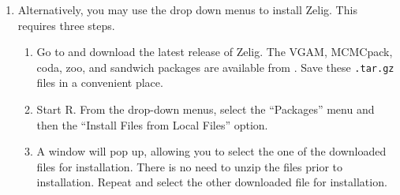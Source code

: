 \begin{enumerate}
\begin{enumerate}
  \item Alternatively, you may use the drop down menus to install
    Zelig.  This requires three steps.  
  \begin{enumerate} 
  \item Go to  and 
    download the latest release of Zelig.  The VGAM, MCMCpack,
coda, zoo, and sandwich packages are available from
.
Save these \texttt{.tar.gz} files in a convenient place.
  \item Start R.  From the drop-down menus, select the ``Packages''
    menu and then the ``Install Files from Local Files'' option.
  \item A window will pop up, allowing you to select the one of the
    downloaded files for installation.  There is no need to unzip
    the files prior to installation.  Repeat and select the other
    downloaded file for installation.
  \end{enumerate} 
  
\end{enumerate}


\end{enumerate}
